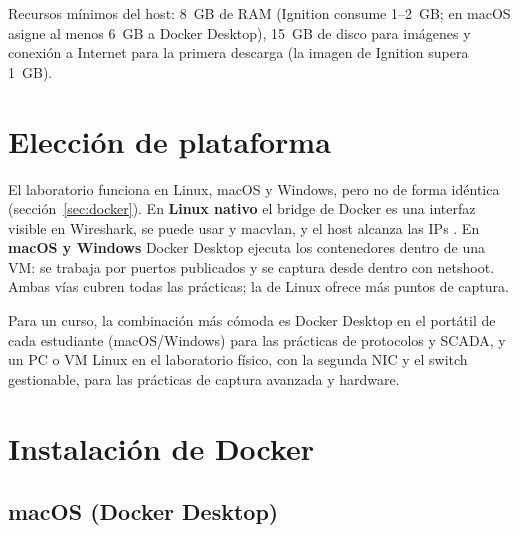 Recursos mínimos del host: 8~GB de RAM (Ignition consume 1--2~GB; en macOS asigne al menos 6~GB a Docker Desktop), 15~GB de disco para imágenes y conexión a Internet para la primera descarga (la imagen de Ignition supera 1~GB).

\section{Elección de plataforma}
\label{sec:plataforma}

El laboratorio funciona en Linux, macOS y Windows, pero no de forma idéntica (sección~\ref{sec:docker}). En \textbf{Linux nativo} el bridge de Docker es una interfaz visible en Wireshark, se puede usar  y macvlan, y el host alcanza las IPs . En \textbf{macOS y Windows} Docker Desktop ejecuta los contenedores dentro de una VM: se trabaja por puertos publicados y se captura desde dentro con netshoot. Ambas vías cubren todas las prácticas; la de Linux ofrece más puntos de captura.

\begin{nota}[Recomendación]
Para un curso, la combinación más cómoda es Docker Desktop en el portátil de cada estudiante (macOS/Windows) para las prácticas de protocolos y SCADA, y un PC o VM Linux en el laboratorio físico, con la segunda NIC y el switch gestionable, para las prácticas de captura avanzada y hardware.
\end{nota}

\section{Instalación de Docker}

\subsection{macOS (Docker Desktop)}

